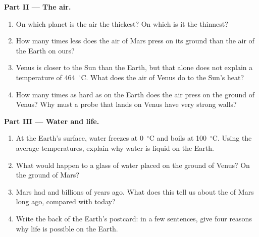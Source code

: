 \begin{problem}
\medskip
\noindent\textbf{Part II --- The air.}
\begin{enumerate}[resume]
  \item On which planet is the air the thickest? On which is it the
        thinnest?
  \item How many times less does the air of Mars press on its ground than
        the air of the Earth on ours?
  \item Venus is closer to the Sun than the Earth, but that alone does not
        explain a temperature of 464~$^\circ$C. What does the air of Venus
        do to the Sun's heat?
  \item How many times as hard as on the Earth does the air press on the
        ground of Venus? Why must a probe that lands on Venus have very strong walls?
\end{enumerate}

\medskip
\noindent\textbf{Part III --- Water and life.}
\begin{enumerate}[resume]
  \item At the Earth's surface, water freezes at 0~$^\circ$C and boils at
        100~$^\circ$C. Using the average temperatures, explain why water is
        liquid on the Earth.
  \item What would happen to a glass of water placed on the ground of
        Venus? On the ground of Mars?
  \item Mars had  and  billions of years ago. What does this
        tell us about the  of Mars long ago, compared with today?
  \item Write the back of the Earth's postcard: in a few sentences, give
        four reasons why life is possible on the Earth.
\end{enumerate}
\end{problem}
